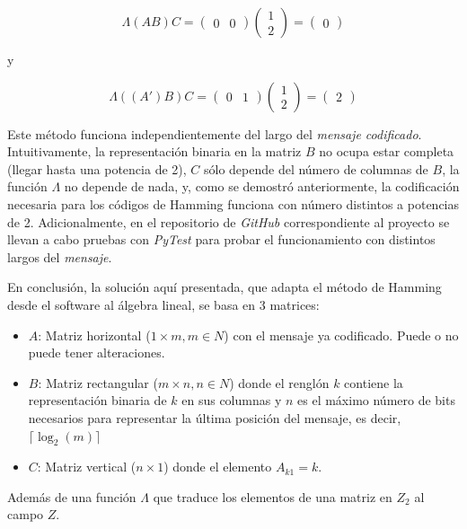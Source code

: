 \documentclass{article}
\begin{document}
$$
\Lambda(AB)C = \begin{pmatrix}
    0 & 0
\end{pmatrix}
\begin{pmatrix}
    1 \\ 2
\end{pmatrix}
= \begin{pmatrix}
    0
\end{pmatrix}
$$
\begin{center}
    y
\end{center}
$$
\Lambda((A')B)C = \begin{pmatrix}
    0 & 1
\end{pmatrix}
\begin{pmatrix}
    1 \\ 2
\end{pmatrix}
= \begin{pmatrix}
    2
\end{pmatrix}
$$

Este método funciona independientemente del largo del \textit{mensaje codificado}. Intuitivamente, la representación binaria en la matriz $B$ no ocupa estar completa (llegar hasta una potencia de 2), $C$ sólo depende del número de columnas de $B$, la función $\Lambda$ no depende de nada, y, como se demostró anteriormente, la codificación necesaria para los códigos de Hamming funciona con número distintos a potencias de 2. Adicionalmente, en el repositorio de \textit{GitHub} correspondiente al proyecto se llevan a cabo pruebas con \textit{PyTest} para probar el funcionamiento con distintos largos del \textit{mensaje}. 

En conclusión, la solución aquí presentada, que adapta el método de Hamming desde el software al álgebra lineal, se basa en 3 matrices:
\begin{itemize}
    \item $A$: Matriz horizontal ($1 \times m, m \in N$) con el mensaje ya codificado. Puede o no puede tener alteraciones.
    \item $B$: Matriz rectangular ($m \times n, n \in N$) donde el renglón $k$ contiene la representación binaria de $k$ en sus columnas y $n$ es el máximo número de bits necesarios para representar la última posición del mensaje, es decir, $\lceil \log_2 (m) \rceil$
    \item $C$: Matriz vertical ($n \times 1$) donde el elemento $A_{k1} = k$.
\end{itemize}
Además de una función $\Lambda$ que traduce los elementos de una matriz en $Z_2$ al campo $Z$.
\end{document}

